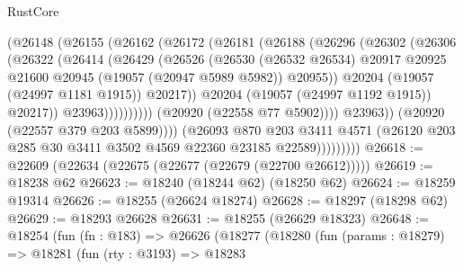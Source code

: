 \begin{lexlean}{RustCore}
\begin{coremodule}
                                  (@26148
                                    (@26155
                                      (@26162
                                        (@26172
                                          (@26181
                                            (@26188
                                              (@26296
                                                (@26302
                                                  (@26306
                                                    (@26322
                                                      (@26414
                                                        (@26429
                                                          (@26526
                                                            (@26530
                                                              (@26532 @26534)
                                                              @20917
                                                              @20925
                                                              @21600
                                                              @20945
                                                              (@19057 (@20947 @5989 @5982))
                                                              @20955))
                                                          @20204
                                                          (@19057 (@24997 @1181 @1915))
                                                          @20217))
                                                      @20204
                                                      (@19057 (@24997 @1192 @1915))
                                                      @20217))
                                                  @23963))))))))))
                              (@20920 (@22558 @77 @5902))))
                          @23963))
                      (@20920 (@22557 @379 @203 @5899))))
                  (@26093
                    @870
                    @203
                    @3411
                    @4571
                    (@26120 @203 @285 @30 @3411 @3502 @4569 @22360 @23185 @22589)))))))))
@26618 := @22609 (@22634 (@22675 (@22677 (@22679 (@22700 @26612)))))
@26619 := @18238 @62
@26623 := @18240 (@18244 @62) (@18250 @62)
@26624 := @18259 @19314
@26626 := @18255 (@26624 @18274)
@26628 := @18297 (@18298 @62)
@26629 := @18293 @26628
@26631 := @18255 (@26629 @18323)
@26648 := @18254
    (fun (fn : @183) =>
    @26626
      (@18277
        (@18280
          (fun (params : @18279) =>
          @18281
            (fun (rty : @3193) =>
            @18283

\end{coremodule}
\end{lexlean}
